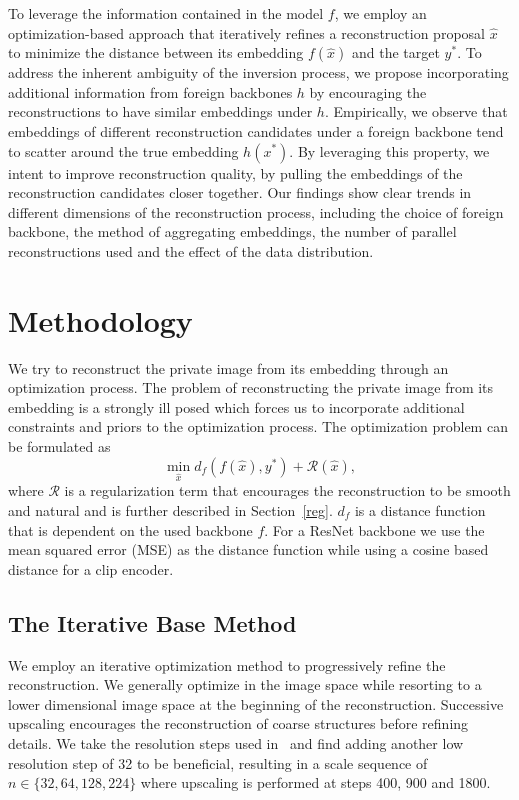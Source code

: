 \documentclass[10pt,twocolumn]{article}
\begin{document}
To leverage the information contained in the model $f$, we employ an optimization-based approach that iteratively refines a reconstruction proposal $\hat{x}$ to minimize the distance between its embedding $f(\hat{x})$ and the target $y^*$.
To address the inherent ambiguity of the inversion process, we propose incorporating additional information from foreign backbones $h$ by encouraging the reconstructions to have similar embeddings under $h$.
Empirically, we observe that embeddings of different reconstruction candidates under a foreign backbone tend to scatter around the true embedding $h(x^*)$.
By leveraging this property, we intent to improve reconstruction quality, by pulling the embeddings of the reconstruction candidates closer together.
Our findings show clear trends in different dimensions of the reconstruction process, including the choice of foreign backbone, the method of aggregating embeddings, the number of parallel reconstructions used and the effect of the data distribution.

\section{Methodology}
We try to reconstruct the private image from its embedding through an optimization process.
The problem of reconstructing the private image from its embedding is a strongly ill posed which forces us to incorporate additional constraints and priors to the optimization process.
The optimization problem can be formulated as
$$
\min_{\hat{x}} d_f(f(\hat{x}), y^*) + \mathcal{R}(\hat{x}),
$$
where $\mathcal{R}$ is a regularization term that encourages the reconstruction to be smooth and natural and is further described in Section~\ref{reg}.
$d_f$ is a distance function that is dependent on the used backbone $f$.
For a ResNet backbone we use the mean squared error (MSE) as the distance function while using a cosine based distance for a clip encoder.
\subsection{The Iterative Base Method}\label{base_method}
We employ an iterative optimization method to progressively refine the reconstruction.
We generally optimize in the image space while resorting to a lower dimensional image space at the beginning of the reconstruction.
Successive upscaling encourages the reconstruction of coarse structures before refining details.
We take the resolution steps used in~\cite{kazemiWhatWeLearn2024} and find adding another low resolution step of 32 to be beneficial, resulting in a scale sequence of $n\in\{32, 64, 128, 224\}$ where upscaling is performed at steps 400, 900 and 1800.
\end{document}
